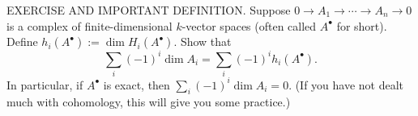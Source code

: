 EXERCISE AND IMPORTANT DEFINITION. Suppose $0\to A_1\to\cdots\to A_n\to0$ is a complex of finite-dimensional $k$-vector spaces (often called $A^\bullet$ for short). Define $h_i(A^\bullet):=\dim H_i(A^\bullet)$. Show that
$$\sum_i(-1)^i\dim A_i=\sum_i(-1)^i h_i(A^\bullet).$$
In particular, if $A^\bullet$ is exact, then $\sum_i(-1)^i\dim A_i=0$. (If you have not dealt much with cohomology, this will give you some practice.)
